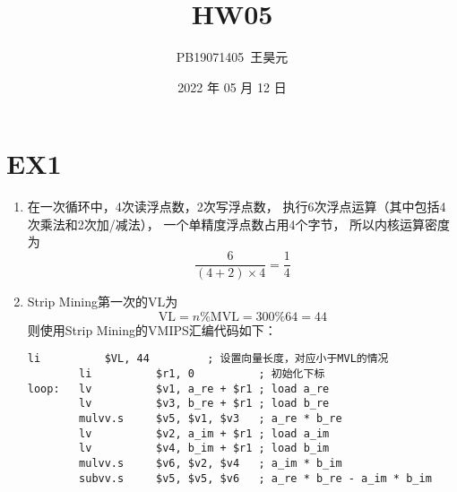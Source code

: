 \documentclass{article}
\title{HW05}
\author{PB19071405\ 王昊元}
\date{2022 年 05 月 12 日}
\begin{document}
    \maketitle

    \section*{EX1}
    \begin{enumerate}
        \item 在一次循环中，4次读浮点数，2次写浮点数，
        执行6次浮点运算（其中包括4次乘法和2次加/减法），
        一个单精度浮点数占用4个字节，
        所以内核运算密度为
        \[\frac{6}{(4 + 2) \times 4} = \frac{1}{4}\]
        \item Strip Mining第一次的VL为\[\text{VL} = n \% \text{MVL} = 300 \% 64 = 44\]
        则使用Strip Mining的VMIPS汇编代码如下：
        \begin{lstlisting}[language={[x86masm]Assembler}]
        li          $VL, 44         ; 设置向量长度，对应小于MVL的情况
        li          $r1, 0          ; 初始化下标
loop:   lv          $v1, a_re + $r1 ; load a_re
        lv          $v3, b_re + $r1 ; load b_re
        mulvv.s     $v5, $v1, $v3   ; a_re * b_re
        lv          $v2, a_im + $r1 ; load a_im
        lv          $v4, b_im + $r1 ; load b_im
        mulvv.s     $v6, $v2, $v4   ; a_im * b_im
        subvv.s     $v5, $v5, $v6   ; a_re * b_re - a_im * b_im

\end{lstlisting}
\end{enumerate}
\end{document}
